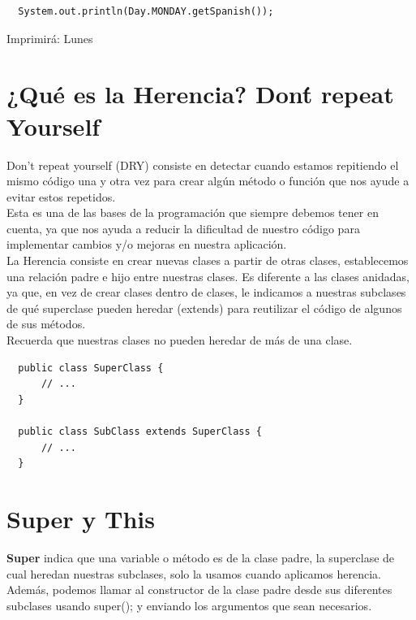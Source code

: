 \documentclass{article}
\begin{document}
\begin{verbatim}
  System.out.println(Day.MONDAY.getSpanish());
\end{verbatim}

Imprimirá: Lunes\\


\section{¿Qué es la Herencia? Don\'t repeat Yourself}%
Don’t repeat yourself (DRY) consiste en detectar cuando estamos repitiendo el
mismo código una y otra vez para crear algún método o función que nos ayude a
evitar estos repetidos.\\

Esta es una de las bases de la programación que siempre debemos tener en
cuenta, ya que nos ayuda a reducir la dificultad de nuestro código para
implementar cambios y/o mejoras en nuestra aplicación.\\

La Herencia consiste en crear nuevas clases a partir de otras clases,
establecemos una relación padre e hijo entre nuestras clases. Es diferente a
las clases anidadas, ya que, en vez de crear clases dentro de clases, le
indicamos a nuestras subclases de qué superclase pueden heredar (extends) para
reutilizar el código de algunos de sus métodos.\\

Recuerda que nuestras clases no pueden heredar de más de una clase.\\

\begin{verbatim}
  public class SuperClass {
      // ...
  }

  public class SubClass extends SuperClass {
      // ...
  }
\end{verbatim}


\section{Super y This}%
\textbf{Super} indica que una variable o método es de la clase padre, la
superclase de cual heredan nuestras subclases, solo la usamos cuando aplicamos
herencia.\\

Además, podemos llamar al constructor de la clase padre desde sus diferentes
subclases usando super(); y enviando los argumentos que sean necesarios.\\
\end{document}
